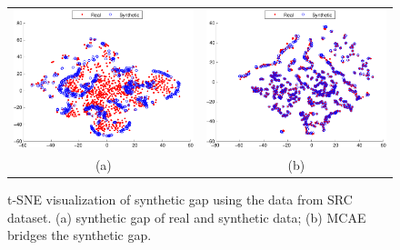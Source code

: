 \documentclass{iitthesis}
\begin{document}
\begin{figure}[h]
\centering
\begin{tabular}{cc}
\includegraphics[scale=0.49]{Pic/PDF/Autoencoder/tsne_visualization/Real2-crop} 
& 
\includegraphics[scale=0.49]{Pic/PDF/Autoencoder/tsne_visualization/Reconst2-crop}\tabularnewline
(a) & (b)\tabularnewline
\end{tabular}\protect\caption{t-SNE visualization of synthetic gap using the data from SRC dataset. (a) synthetic gap of real and
synthetic data; (b) MCAE bridges the synthetic gap.}
\label{fig: tsne_vis} 
\end{figure}
\end{document}
